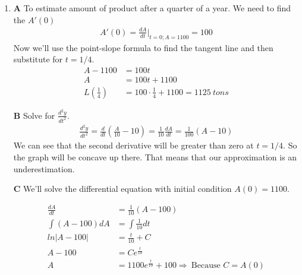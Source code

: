 \documentclass[13pt, a4paper, twoside]{article}
\begin{document}
\begin{enumerate}
\item \textbf{A} To estimate amount of product after a quarter of a year.
We need to find the $A'(0)$
\begin{align*}
    A'(0) = \frac{dA}{dt}|_{t=0; A=1100} = 100
\end{align*}
\newpage
Now we'll use the point-slope formula to find the tangent line and 
then substitute for $t=1/4$.
\begin{align*}
    A - 1100 &= 100t\\
    A &= 100t + 1100 \\ 
    L(\frac{1}{4}) &= 100\cdot \frac{1}{4} + 1100 = 1125 \: tons
\end{align*}

\textbf{B} Solve for $\frac{d^2y}{dt^2}$.
\begin{align*}
    \frac{d^2y}{dt^2} = \frac{d}{dt}(\frac{A}{10}-10) = \frac{1}{10}\frac{dA}{dt} = \frac{1}{100}(A-10)
\end{align*}
We can see that the second derivative will be greater than zero at 
$t=1/4$. So the graph will be concave up there. That means that our 
approximation is an underestimation.

\textbf{C} We'll solve the differential equation with initial condition
$A(0)=1100$.

\begin{align*}
    \frac{dA}{dt}&=\frac{1}{10}(A-100)\\
    \int (A-100)dA &= \int \frac{1}{10}dt\\ 
    ln|A-100| &= \frac{t}{10} + C \\ 
    A - 100 &= Ce^{\frac{t}{10}} \\ 
    A &= 1100e^{\frac{t}{10}} + 100 \Rightarrow \: \text{Because } C=A(0)
\end{align*}

\end{enumerate}
\end{document}
